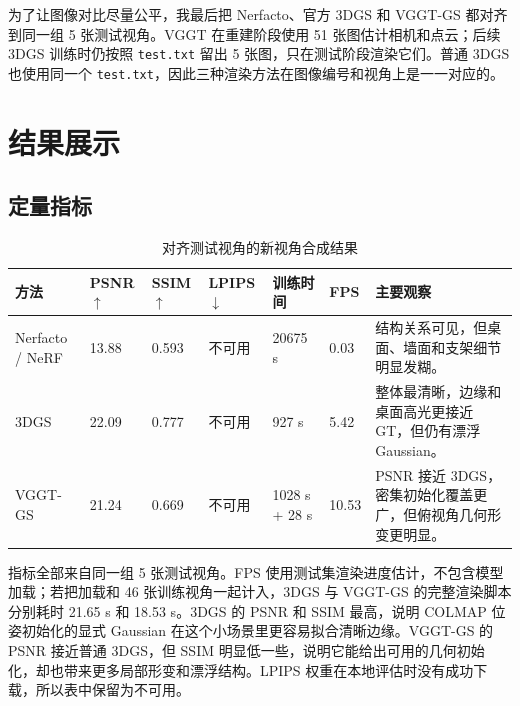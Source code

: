\documentclass[UTF8,a4paper,11pt]{ctexart}
\begin{document}
为了让图像对比尽量公平，我最后把 Nerfacto、官方 3DGS 和 VGGT-GS 都对齐到同一组 5 张测试视角。VGGT 在重建阶段使用 51 张图估计相机和点云；后续 3DGS 训练时仍按照 \texttt{test.txt} 留出 5 张图，只在测试阶段渲染它们。普通 3DGS 也使用同一个 \texttt{test.txt}，因此三种渲染方法在图像编号和视角上是一一对应的。

\section{结果展示}

\subsection{定量指标}

\begin{table}[H]
  \centering
  \caption{对齐测试视角的新视角合成结果}
  \label{tab:view-synthesis}
  \scriptsize
  \setlength{\tabcolsep}{3pt}
  \begin{tabular}{p{2.0cm}p{1.25cm}p{1.25cm}p{1.35cm}p{1.9cm}p{1.55cm}p{5.0cm}}
    \toprule
    方法 & PSNR $\uparrow$ & SSIM $\uparrow$ & LPIPS $\downarrow$ & 训练时间 & FPS & 主要观察 \\
    \midrule
    Nerfacto / NeRF & 13.88 & 0.593 & 不可用 & 20675 s & 0.03 & 结构关系可见，但桌面、墙面和支架细节明显发糊。\\
    3DGS & 22.09 & 0.777 & 不可用 & 927 s & 5.42 & 整体最清晰，边缘和桌面高光更接近 GT，但仍有漂浮 Gaussian。\\
    VGGT-GS & 21.24 & 0.669 & 不可用 & 1028 s + 28 s & 10.53 & PSNR 接近 3DGS，密集初始化覆盖更广，但俯视角几何形变更明显。\\
    \bottomrule
  \end{tabular}
\end{table}

指标全部来自同一组 5 张测试视角。FPS 使用测试集渲染进度估计，不包含模型加载；若把加载和 46 张训练视角一起计入，3DGS 与 VGGT-GS 的完整渲染脚本分别耗时 21.65 s 和 18.53 s。3DGS 的 PSNR 和 SSIM 最高，说明 COLMAP 位姿初始化的显式 Gaussian 在这个小场景里更容易拟合清晰边缘。VGGT-GS 的 PSNR 接近普通 3DGS，但 SSIM 明显低一些，说明它能给出可用的几何初始化，却也带来更多局部形变和漂浮结构。LPIPS 权重在本地评估时没有成功下载，所以表中保留为不可用。
\end{document}
